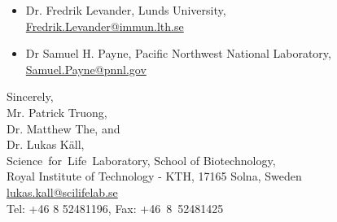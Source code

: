\documentclass[a4paper]{letter}
\begin{document}
\begin{letter}{}
\begin{itemize}
\item Dr. Fredrik Levander, Lunds University,\\
\url{Fredrik.Levander@immun.lth.se}

\item Dr Samuel H. Payne, Pacific Northwest National Laboratory, \\
\url{Samuel.Payne@pnnl.gov}

\end{itemize}

\vspace*{1.5em}

Sincerely,\\[2em]
Mr. Patrick Truong,\\
Dr. Matthew The, and\\
Dr. Lukas K\"all, \\
Science~for~Life~Laboratory, School of Biotechnology,\\
Royal Institute of Technology - KTH, 17165 Solna, Sweden\\
\url{lukas.kall@scilifelab.se}\\
Tel: +46 8 52481196, Fax: +46~8~52481425

\end{letter}
\end{document}
